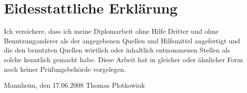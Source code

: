 \chapter*{Eidesstattliche Erkl\"{a}rung}\thispagestyle{empty}Ich versichere, dass ich meine Diplomarbeit ohne Hilfe Dritter und ohne Benutzunganderer als der angegebenen Quellen und Hilfsmittel angefertigt und die den benutzten Quellen w\"{o}rtlich oder inhaltlich entnommenen Stellen als solche kenntlich gemacht habe. Diese Arbeit hat in gleicher oder \"{a}hnlicher Form noch keiner Pr\"{u}fungsbeh\"{o}rde vorgelegen.\bigskip\raggedright{Mannheim, den 17.06.2008} \bigskip \bigskip \bigskip Thomas Plotkowiak